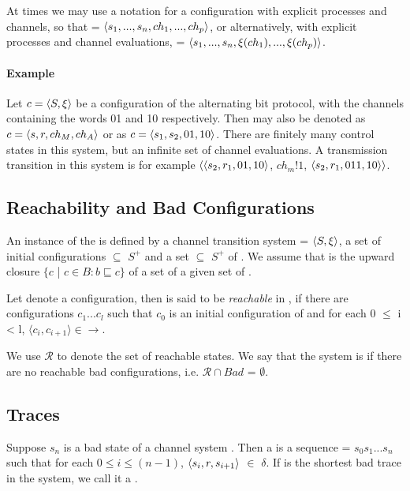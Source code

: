 At times we may use a notation for a configuration  with explicit processes and channels, so that  = $\langle s_1,...,s_n, ch_1,...,ch_p\rangle$, or alternatively, with explicit processes and channel evaluations,  = $\langle s_1,...,s_n, \xi(ch_1),...,\xi(ch_p)\rangle$.

\paragraph{Example}
Let $c = \langle S,\xi\rangle$ be a configuration of the alternating bit protocol, with the channels containing the words 01 and 10 respectively. Then  may also be denoted as $c = \langle s,r,ch_M,ch_A\rangle$ or as $c = \langle s_1,s_2,01,10\rangle$. There are finitely many control states in this system, but an infinite set of channel evaluations. A transmission transition in this system is for example $\langle\langle s_2,r_1,01,10\rangle$, $ch_m!1$, $\langle s_2,r_1,011,10\rangle\rangle$. 

\subsection{Reachability and Bad Configurations}
An instance of the  is defined by a channel transition system  = $\langle S,\xi\rangle$, a set of initial configurations  $\subseteq$ $S^+$ and a set  $\subseteq$ $S^+$ of . We assume that  is the upward closure $\{c$ | $ c \in B: b \sqsubseteq c\}$ of a set of a given  set of . 

Let  denote a configuration, then  is said to be \emph{reachable} in , if there are configurations $c_1...c_l$ such that $c_0$ is an initial configuration of  and for each 0 $\leq$ i < l, $\langle c_i, c_{i+1} \rangle \in \rightarrow$.

We use $\mathcal{R}$ to denote the set of reachable states. We say that the system  is  if there are no reachable bad configurations, i.e. $\mathcal{R} \cap Bad$ = $\emptyset$.

\subsection{Traces}

Suppose $s_n$ is a bad state of a channel system . Then a  is a sequence  = $s_0s_1...s_n$ such that for each $0 \leq i \leq (n-1)$, $\langle s_i,r,s_{i+1}\rangle$ $\in$ $\delta$. If  is the shortest bad trace in the system, we call it a .

